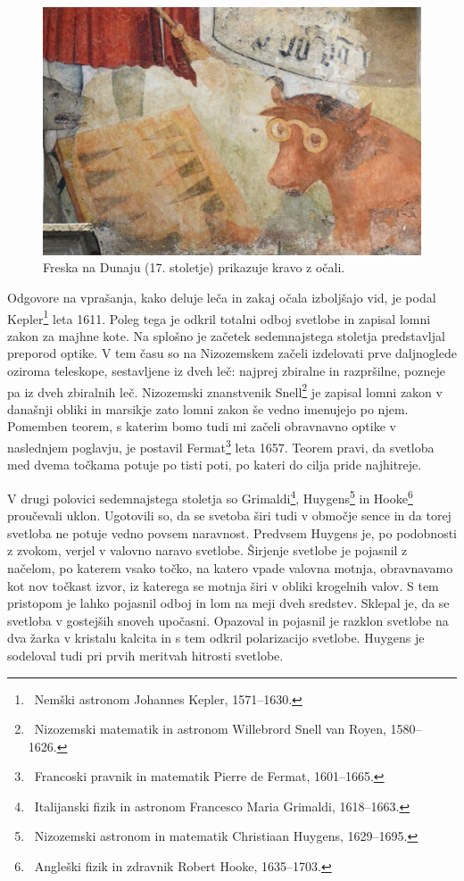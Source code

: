 \begin{figure}[ht]
\centering
\includegraphics[width=85truemm]{slike/01_Dunaj.jpg}
\caption{Freska na Dunaju (17. stoletje) prikazuje kravo z očali.}
\label{fig:01_Dunaj}
\end{figure}

Odgovore na vprašanja, kako deluje leča in zakaj očala izboljšajo vid, je podal
Kepler\footnote{~Nemški astronom Johannes Kepler, 1571--1630.} leta 1611. 
Poleg tega je odkril totalni odboj svetlobe in zapisal lomni zakon za majhne kote.
Na splošno je začetek sedemnajstega stoletja predstavljal preporod optike. 
V tem času so na Nizozemskem začeli izdelovati prve daljnoglede oziroma
teleskope, sestavljene iz dveh leč:
najprej zbiralne in razpršilne, pozneje pa iz dveh zbiralnih leč. 
Nizozemski znanstvenik Snell\footnote{~Nizozemski matematik in astronom Willebrord 
Snell van Royen, 1580--1626.} je zapisal lomni zakon v današnji obliki in 
marsikje zato lomni zakon še vedno imenujejo po njem. Pomemben teorem, s katerim
bomo tudi mi začeli obravnavno optike v naslednjem poglavju, je postavil 
Fermat\footnote{~Francoski pravnik in matematik Pierre de Fermat, 1601--1665.} 
leta 1657. Teorem pravi, da svetloba med dvema točkama potuje po tisti poti, 
po kateri do cilja pride najhitreje.

V drugi polovici sedemnajstega stoletja so Grimaldi\footnote{~Italijanski 
fizik in astronom Francesco Maria Grimaldi, 1618--1663.}, Huygens\footnote{~Nizozemski 
astronom in matematik Christiaan Huygens, 1629--1695.} in Hooke\footnote{~Angleški 
fizik in zdravnik Robert Hooke, 1635--1703.} proučevali uklon. Ugotovili so, da se 
svetoba širi tudi v območje sence in da torej svetloba ne potuje vedno 
povsem naravnost. Predvsem Huygens je, po podobnosti z zvokom, verjel v 
valovno naravo svetlobe. Širjenje svetlobe je pojasnil z načelom, 
po katerem vsako točko, na katero vpade valovna motnja, obravnavamo 
kot nov točkast izvor, iz katerega se motnja širi v obliki krogelnih valov. 
S tem pristopom je lahko pojasnil odboj in lom na meji dveh sredstev. Sklepal je, da
se svetloba v gostejših snoveh upočasni.
Opazoval in pojasnil je razklon svetlobe na dva žarka v kristalu kalcita 
in s tem odkril polarizacijo svetlobe. Huygens je sodeloval tudi pri 
prvih meritvah hitrosti svetlobe. 


